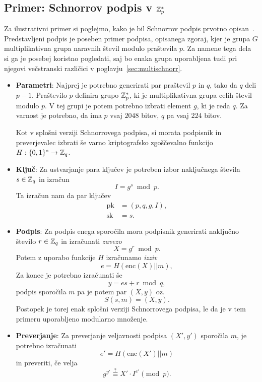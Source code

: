 \subsection{Primer: Schnorrov podpis v \texorpdfstring{$\mathbb Z_p^*$}{Zp∗}}
Za ilustrativni primer si poglejmo, kako je bil Schnorrov podpis prvotno opisan~\cite{schnorr1989sig}.
Predstavljeni podpis je poseben primer podpisa, opisanega zgoraj, kjer je grupa $G$ multiplikativna
grupa naravnih števil modulo praštevila $p$. Za namene tega dela si ga je posebej koristno pogledati,
saj bo enaka grupa uporabljena tudi pri njegovi večstranski različici v poglavju~\ref{sec:multischnorr}.
\begin{itemize}
    \item \textbf{Parametri}:
    Najprej je potrebno generirati par praštevil $p$ in $q$, tako da $q$ deli $p - 1$. Praštevilo $p$
    definira grupo $\mathbb Z_p^*$, ki je multiplikativna grupa celih števil modulo $p$. V tej grupi je potem
    potrebno izbrati element $g$, ki je reda $q$. Za varnost je potrebno, da ima $p$ vsaj $2048$ bitov,
    $q$ pa vsaj $224$ bitov.

    Kot v splošni verziji Schnorrovega podpisa, si morata podpisnik in preverjevalec izbrati še varno
    kriptografsko zgoščevalno funkcijo $H : \{0, 1\}^* \rightarrow \mathbb Z_q$.

    \item \textbf{Ključ}:
    Za ustvarjanje para ključev je potreben izbor naključnega števila $s \in \mathbb Z_q$
    in izračun 
    $$ 
    I = g^s \bmod p.
    $$
    Ta izračun nam da par ključev
    \begin{align*}
    \text{pk} &= (p, q, g, I), \\
    \text{sk} &= s.
    \end{align*}

    \item \textbf{Podpis}:
    Za podpis enega sporočila mora podpisnik generirati naključno število $r \in \mathbb Z_q$ in izračunati 
    \textit{zavezo} 
    $$ 
    X = g^r \bmod p.
    $$ 
    Potem z uporabo funkcije $H$ izračunamo \textit{izziv} 
    $$
    e = H(\text{enc}(X) || m),
    $$
    Za konec je potrebno izračunati še 
    $$ 
    y = es + r \bmod q, 
    $$
    podpis sporočila $m$ pa je potem par $(X, y)$ oz.\ 
    $$ 
    S(s, m) = (X, y).
    $$
    Postopek je torej enak splošni verziji Schnorrovega podpisa, le da je v tem primeru uporabljeno
    modularno množenje.

    \item \textbf{Preverjanje}:
    Za preverjanje veljavnosti podpisa $(X', y')$ sporočila $m$, je potrebno izračunati 
    $$ 
    e' = H(\text{enc}(X') || m)
    $$
    in preveriti, če velja 
    \begin{equation}
        g^{y'} \stackrel{?}{\equiv} X' \cdot I^{e'} \pmod p. \label{eq:schnorr-ver}
    \end{equation}
\end{itemize}

